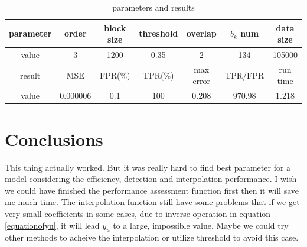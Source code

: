 \documentclass[11pt, a4paper]{article}
\begin{document}
\begin{table}
	\centering
	\caption{parameters and results}
	\begin{tabular}{|c|c|c|c|c|c|c|}
		\hline
		parameter & order & block size & threshold & overlap & $b_k$ num & data size\\
		\hline
		value & 3 & 1200 & 0.35 & 2 & 134 & 105000\\
		\hline
		result & MSE & FPR(\%) & TPR(\%) & max error & TPR/FPR & run time\\
		\hline
		value & 0.000006 & 0.1 & 100 & 0.208 & 970.98 & 1.218\\
		\hline
	\end{tabular}
	\label{tab1}
\end{table}



\section{Conclusions}
This thing actually worked. But it was really hard to find best parameter for a model considering the efficiency, detection and interpolation performance. I wish we could have finished the performance assessment function first then it will save me much time. The interpolation function still have some problems that if we get very small coefficients in some cases, due to inverse operation in equation \ref{equationofyu}, it will lead $y_u$ to a large, impossible value. Maybe we could try other methods to acheive the interpolation or utilize threshold to avoid this case.


%
%
\end{document}
